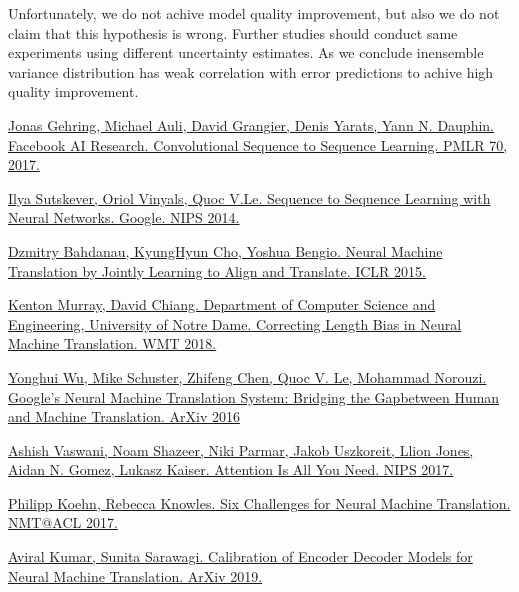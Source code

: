 \documentclass[a4paper,14pt]{extarticle}
\begin{document}
	Unfortunately, we do not achive model quality improvement, but also we do not claim that this hypothesis is wrong. Further studies should conduct same experiments using different uncertainty estimates. As we conclude inensemble variance distribution has weak correlation with error predictions to achive high quality improvement.
	
	\begin{thebibliography}{0}		
		\hypertarget{fconv}{}
		\href{https://arxiv.org/pdf/1705.03122.pdf}
		{Jonas Gehring, Michael Auli, David Grangier, Denis Yarats, Yann N. Dauphin. Facebook AI Research. Convolutional Sequence to Sequence Learning. PMLR 70, 2017.}
		
		\hypertarget{seq2seq}{}
		\href{https://papers.nips.cc/paper/5346-sequence-to-sequence-learning-with-neural-networks.pdf}
		{Ilya Sutskever, Oriol Vinyals, Quoc V.Le. Sequence to Sequence Learning with Neural Networks. Google. NIPS 2014.}
		
		\hypertarget{encdec_att}{}
		\href{https://arxiv.org/pdf/1409.0473.pdf}
		{Dzmitry Bahdanau, KyungHyun Cho, Yoshua Bengio. Neural Machine Translation by Jointly Learning to Align and Translate. ICLR 2015.}
		
		\hypertarget{corr_len_bias}{}
		\href{https://arxiv.org/pdf/1808.10006.pdf}
		{Kenton Murray, David Chiang. Department of Computer Science and Engineering, University of Notre Dame. Correcting Length Bias in Neural Machine Translation. WMT 2018.}
		
		\hypertarget{gnmt}{}
		\href{https://arxiv.org/pdf/1609.08144.pdf}
		{Yonghui Wu, Mike Schuster, Zhifeng Chen, Quoc V. Le, Mohammad Norouzi. Google’s Neural Machine Translation System: Bridging the Gapbetween Human and Machine Translation. ArXiv 2016}
		
		\hypertarget{transformer}{}
		\href{https://arxiv.org/pdf/1706.03762.pdf}
		{Ashish Vaswani, Noam Shazeer, Niki Parmar, Jakob Uszkoreit, Llion Jones, Aidan N. Gomez, Lukasz Kaiser. Attention Is All You Need. NIPS 2017.}
		
		\hypertarget{six_chall}{}
		\href{https://arxiv.org/pdf/1706.03872.pdf}
		{Philipp Koehn, Rebecca Knowles. Six Challenges for Neural Machine Translation. NMT@ACL 2017.}
		
		\hypertarget{calibration}{}
		\href{https://arxiv.org/pdf/1903.00802v1.pdf}
		{Aviral Kumar, Sunita Sarawagi. Calibration of Encoder Decoder Models for Neural Machine Translation. ArXiv 2019.}
		

\end{thebibliography}
\end{document}
